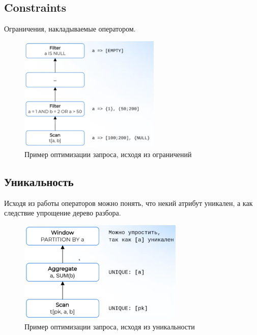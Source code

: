 \documentclass[11pt]{article}
\begin{document}
    \newpage

    \subsection*{Constraints}

    Ограничения, накладываемые оператором.

    \begin{figure}[h!]
        \centering
        \includegraphics[width=0.6\textwidth]{Pictures/Metadata/Рассчёт ограничений}
        \caption{Пример оптимизации запроса, исходя из ограничений}
        \label{fig:constraints}
    \end{figure}

    \subsection*{Уникальность}

    Исходя из работы операторов можно понять, что некий атрибут уникален, а как следствие упрощение дерево разбора.

    \begin{figure}[h!]
        \centering
        \includegraphics[width=0.7\textwidth]{Pictures/Metadata/Рассчёт уникальности}
        \caption{Пример оптимизации запроса, исходя из уникальности}
        \label{fig:unique}
    \end{figure}
\end{document}
